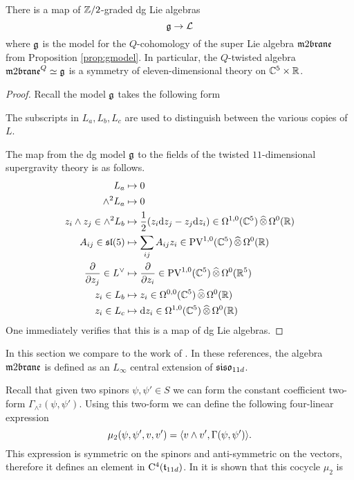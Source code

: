 \documentclass[11pt]{amsart}
\begin{document}
\begin{prop}
There is a map of $\mathbb Z/2$-graded dg Lie algebras 
\[
\mathfrak g \to \mathcal L 
\]
where $\mathfrak g$ is the model for the $Q$-cohomology of the super Lie algebra $\m2$ from Proposition \ref{prop:gmodel}. 
In particular, the $Q$-twisted algebra $\m2^Q \simeq \fg$ is a symmetry of eleven-dimensional theory on $\mathbb C^5 \times \mathbb R$. 
\end{prop}
\begin{proof}
Recall the model $\mathfrak g$ takes the following form
\beqn 
{}
\eeqn
The subscripts in $L_a, L_b, L_c$ are used to distinguish between the various copies of $L$.

The map from the dg model $\mathfrak g$ to the fields of the twisted $11$-dimensional supergravity theory is as follows. 
\begin{align*}
 L_a & \mapsto 0 \\
 \wedge^2 L_a & \mapsto 0 \\
z_i \wedge z_j \in \wedge^2 L_b & \mapsto \frac12 (z_i {\rm d} z_j - z_j {\rm d} z_i) \in \Omega^{1,0} (\mathbb C^5) \, \widehat{\otimes} \, \Omega^0 (\mathbb R) \\
A_{ij} \in \mathfrak{sl}(5) & \mapsto \sum_{ij} A_{ij} z_i \in {\rm PV}^{1,0}(\mathbb C^5) \, \widehat{\otimes} \, \Omega^0(\mathbb R) \\\frac{\partial}{\partial z_j} \in L^\vee & \mapsto
\frac{\partial}{\partial z_i} \in {\rm PV}^{1,0} (\mathbb C^5) \, \widehat{\otimes} \, \Omega^0 (\mathbb R^5) \\ z_i \in L_b & \mapsto z_i \in \Omega^{0,0}(\mathbb C^5) \, \widehat{\otimes} \, \Omega^0 (\mathbb R) \\
z_i \in L_c & \mapsto {\rm d} z_i \in \Omega^{1,0}(\mathbb C^5) \, \widehat{\otimes} \, \Omega^0 (\mathbb R)
\end{align*}
One immediately verifies that this is a map of dg Lie algebras. 
\end{proof}

\parsec[]

In this section we compare to the work of .
In these references, the algebra $\m2$ is defined as an $L_\infty$  
central extension of $\mathfrak{siso}_{11d}$. 

Recall that given two spinors $\psi, \psi' \in S$ we can form the constant coefficient two-form $\Gamma_{\wedge^2} (\psi, \psi')$. 
Using this two-form we can define the following four-linear expression
\[
\mu_2 (\psi, \psi',v,v') = \langle v \wedge v', \Gamma(\psi, \psi')\rangle .
\]
This expression is symmetric on the spinors and anti-symmetric on the vectors, therefore it defines an element in ${\rm C}^4(\mathfrak t_{11d})$. 
In \cite{??} it is shown that this cocycle $\mu_2$ is 
\end{document}
